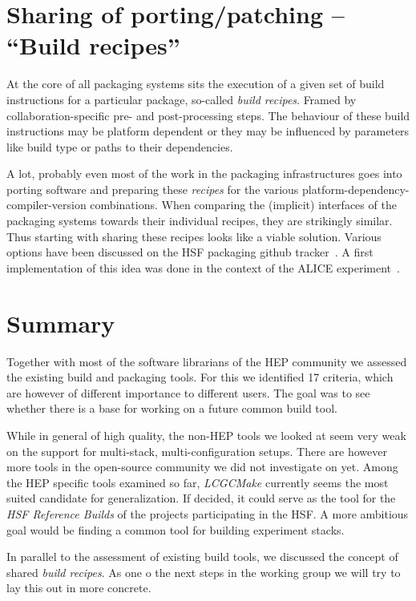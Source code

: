 \documentclass[12pt,a4paper]{article}
\begin{document}
\section{Sharing of porting/patching -- ``Build recipes''}
At the core of all packaging systems sits the execution of a given set of build instructions for a particular package, so-called \emph{build recipes}. Framed by collaboration-specific pre- and post-processing steps. The behaviour of these build instructions may be platform dependent or they may be influenced by parameters like build type or paths to their dependencies. 

A lot, probably even most of the work in the packaging infrastructures goes into porting software and preparing these \emph{recipes} for the various platform-dependency-compiler-version combinations. When comparing the (implicit) interfaces of the packaging systems towards their individual recipes, they are strikingly similar. Thus starting with sharing these recipes looks like a viable solution. Various options have been discussed on the HSF packaging github tracker~\cite{github:discussion}. A first implementation of this idea was done in the context of the ALICE experiment~\cite{alidist}.

\section{Summary}
Together with most of the software librarians of the HEP community we assessed the existing build and packaging tools. For this we identified 17 criteria, which are however of different importance to different users. The goal was to see whether there is a base for working on a future common build tool. 

While in general of high quality, the non-HEP tools we looked at seem very weak on the support for multi-stack, multi-configuration setups. There are however more tools in the open-source community we did not investigate on yet.
Among the HEP specific tools examined so far, \emph{LCGCMake} currently seems the most suited candidate for generalization. If decided, it could serve as the tool for the \emph{HSF Reference Builds} of the projects participating in the HSF. A more ambitious goal would be finding a common tool for building experiment stacks.

In parallel to the assessment of existing build tools, we discussed the concept of shared \emph{build recipes}. As one o the next steps in the working group we will try to lay this out in more concrete.
\end{document}
